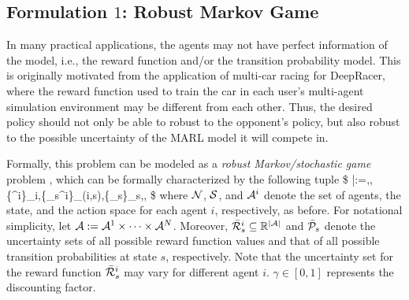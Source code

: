 \subsection{Formulation $1$: Robust Markov Game}\label{sec:Robust_MG_form} 
 
In many practical applications, the agents may not have perfect information of the model, i.e., the reward function and/or the transition probability model. This is originally motivated from the application of multi-car racing for DeepRacer, where the reward function used to train the car in each user's multi-agent simulation environment may be different from each other. Thus, the desired policy should not only be able to robust to the opponent's policy, but also robust to the possible uncertainty of the MARL model it will compete in.  

Formally, this problem can be modeled as  a \emph{robust Markov/stochastic game} problem \citep{kardecs2011discounted}, which can be formally characterized by the following tuple 
\$
{\bar{\cG}:=\la\cN,\cS,\{\cA^i\}_{i\in\cN},\{\ocR_{s}^i\}_{(i,s)\in\cN\times\cS},\{\ocP_s\}_{s\in\cS},\gamma\ra,}
\$
where  $\mathcal{N}$, ${\mathcal{S}}$, and $\mathcal{A}^i$ denote the set of agents, the state, and the action space for each agent $i$, respectively, as before.
For notational simplicity, let $\mathcal{A}:=\mathcal{A}^1\times\cdots\times\mathcal{A}^N$. 
Moreover, $\bar{\mathcal{R}}_{s}^i\subseteq \mathbb{R}^{|\mathcal{A}|}$ and $\bar{\mathcal{P}}_s$  denote the uncertainty sets of all possible reward function values and that of all possible transition probabilities  at state $s$, respectively. 
Note that the uncertainty set for the reward function $\bar{\mathcal{R}}_{s}^i$ may vary for different agent $i$. 
 $\gamma\in[0,1]$ represents the discounting factor. 

